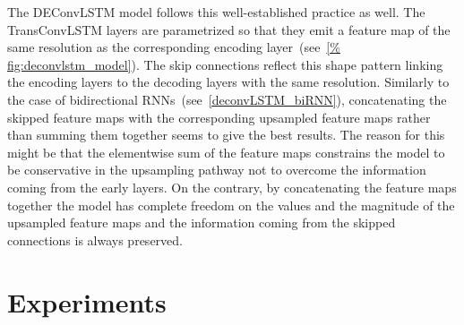 The DEConvLSTM model follows this well-established practice as well. The
TransConvLSTM layers are parametrized so that they emit a feature map of the
same resolution as the corresponding encoding layer~(see~\autoref{%
fig:deconvlstm_model}). The skip connections reflect this shape pattern linking
the encoding layers to the decoding layers with the same resolution. Similarly
to the case of bidirectional RNNs~(see~\autoref{deconvLSTM_biRNN}),
concatenating the skipped feature maps with the corresponding upsampled feature
maps rather than summing them together seems to give the best results. The
reason for this might be that the elementwise sum of the feature maps
constrains the model to be conservative in the upsampling pathway not to
overcome the information coming from the early layers. On the contrary, by
concatenating the feature maps together the model has complete freedom on the
values and the magnitude of the upsampled feature maps and the information
coming from the skipped connections is always preserved.


\section{Experiments}\label{sec:deconvLSTM_experiments}
%
%


